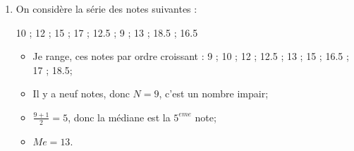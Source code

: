 \documentclass[12pt,a4paper]{article}
\begin{document}
\begin{myexs}
	\begin{enumerate}
		\item On considère la série des notes suivantes : 
		
		\num{10} ; \num{12} ; \num{15} ; \num{17} ; \num{12.5} ; \num{9} ; \num{13} ; \num{18.5} ; \num{16.5}
		
		\begin{itemize}
			\item Je range, ces notes par ordre croissant :
			\num{9} ; \num{10} ; \num{12} ; \num{12.5} ; \num{13} ; \num{15} ; \num{16.5} ; \num{17} ; \num{18.5};
			
			\item Il y a neuf notes, donc $N = 9$, c'est un nombre impair;
			\item $\frac{9+1}{2} = 5$, donc la médiane est la $5^{eme}$ note;
			\item $Me = 13$.
		\end{itemize}
		
	\end{enumerate}
\end{myexs}
\end{document}
